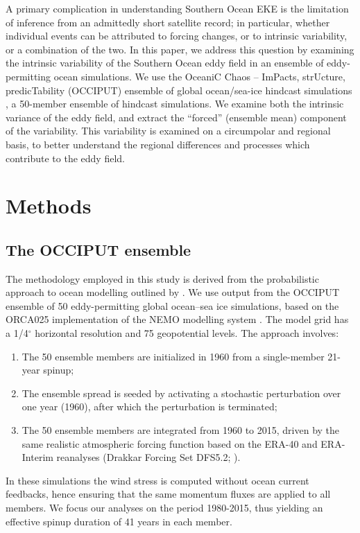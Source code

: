\documentclass[linenumbers]{agujournal2019}
\begin{document}
A primary complication in understanding Southern Ocean EKE is the limitation of inference from an admittedly short satellite record; in particular, whether individual events can be attributed to forcing changes, or to intrinsic variability, or a combination of the two.
In this paper, we address this question by examining the intrinsic variability of the Southern Ocean eddy field in an ensemble of eddy-permitting ocean simulations.
We use the OceaniC Chaos – ImPacts, strUcture, predicTability (OCCIPUT) ensemble of global ocean/sea-ice hindcast simulations \citep{Penduff-etal-2014, Leroux2018}, a 50-member ensemble of hindcast simulations.
We examine both the intrinsic variance of the eddy field, and extract the ``forced'' (ensemble mean) component of the variability.
This variability is examined on a circumpolar and regional basis, to better understand the regional differences and processes which contribute to the eddy field.



\section{Methods}

\subsection{The OCCIPUT ensemble}

The methodology employed in this study is derived from the probabilistic approach to ocean modelling outlined by \citet{Bessieres2017}.
We use output from the OCCIPUT ensemble of 50 eddy-permitting global ocean--sea ice simulations, based on the ORCA025 implementation \citep[e.g.][]{Barnier2006} of the NEMO modelling system \citep{Madec2012}. 
The model grid has a 1/4$^\circ$ horizontal resolution and 75 geopotential levels. 
The approach involves:
\begin{enumerate}
\item The 50 ensemble members are initialized in 1960 from a single-member 21-year spinup;
\item The ensemble spread is seeded by activating a stochastic perturbation \citep{Brankart-etal-2015} over one year (1960), after which the perturbation is terminated;
\item The 50 ensemble members are integrated from 1960 to 2015, driven by the same realistic atmospheric forcing function based on the ERA-40 and ERA-Interim reanalyses (Drakkar Forcing Set DFS5.2; \citet{Dussin-etal-2016}).
\end{enumerate}
In these simulations the wind stress is computed without ocean current feedbacks, hence ensuring that the same momentum fluxes are applied to all members. 
We focus our analyses on the period 1980-2015, thus yielding an effective spinup duration of 41 years in each member. 
\end{document}
